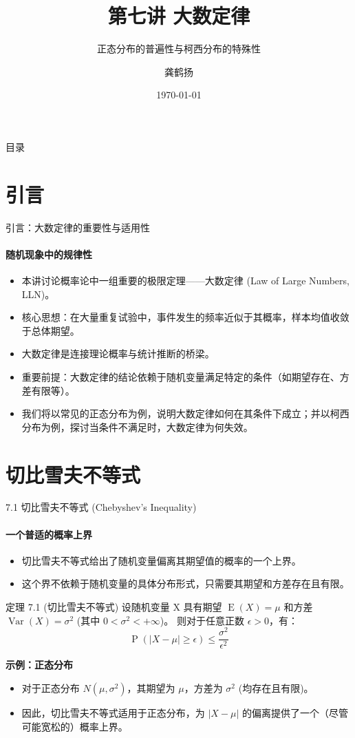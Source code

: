 \documentclass[UTF8]{beamer}
\title{第七讲 大数定律}
\subtitle{正态分布的普遍性与柯西分布的特殊性} %
\author{龚鹤扬}
\institute{中国科学技术大学统计学博士 \\ 上海芯梯科技有限公司}
\date{\today}
\DeclareMathOperator{\E}{\operatorname{E}}
\DeclareMathOperator{\Var}{\operatorname{Var}}
\DeclareMathOperator{\Prob}{\operatorname{P}}
\begin{document}
\begin{frame}
    \titlepage
\end{frame}

\begin{frame}{目录}
    \tableofcontents
\end{frame}

\section{引言}
\begin{frame}[shrink=10]{引言：大数定律的重要性与适用性}
    \framesubtitle{随机现象中的规律性}
    \begin{itemize}
        \item 本讲讨论概率论中一组重要的极限定理——\alert{大数定律 (Law of Large Numbers, LLN)}。
        \item 核心思想：在大量重复试验中，事件发生的\alert{频率}近似于其\alert{概率}，样本均值收敛于总体\alert{期望}。
        \item 大数定律是连接\alert{理论概率}与\alert{统计推断}的桥梁。
        \item \alert{重要前提}：大数定律的结论依赖于随机变量满足特定的\alert{条件}（如期望存在、方差有限等）。
        \item 我们将以常见的\alert{正态分布}为例，说明大数定律如何在其条件下成立；并以\alert{柯西分布}为例，探讨当条件不满足时，大数定律为何失效。
    \end{itemize}
\end{frame}

\section{切比雪夫不等式}
\begin{frame}[shrink=5]{7.1 切比雪夫不等式 (Chebyshev's Inequality)}
    \framesubtitle{一个普适的概率上界}
    \begin{itemize}
        \item 切比雪夫不等式给出了随机变量偏离其期望值的概率的一个\alert{上界}。
        \item 这个界不依赖于随机变量的具体分布形式，只需要其\alert{期望}和\alert{方差}存在且有限。
    \end{itemize}
    \pause
    \begin{block}{定理 7.1 (切比雪夫不等式)}
        设随机变量 X 具有期望 $\E(X) = \mu$ 和方差 $\Var(X) = \sigma^2$ (其中 $0 < \sigma^2 < +\infty$)。
        则对于任意正数 $\epsilon > 0$，有：
        \[ \Prob(|X - \mu| \geq \epsilon) \leq \frac{\sigma^2}{\epsilon^2} \]
    \end{block}
    \pause
    \textbf{示例：正态分布}
    \begin{itemize}
        \item 对于正态分布 $N(\mu, \sigma^2)$，其期望为 $\mu$，方差为 $\sigma^2$ (\alert{均存在且有限})。
        \item 因此，切比雪夫不等式适用于正态分布，为 $|X-\mu|$ 的偏离提供了一个（尽管可能宽松的）概率上界。
    \end{itemize}
\end{frame}
\end{document}

